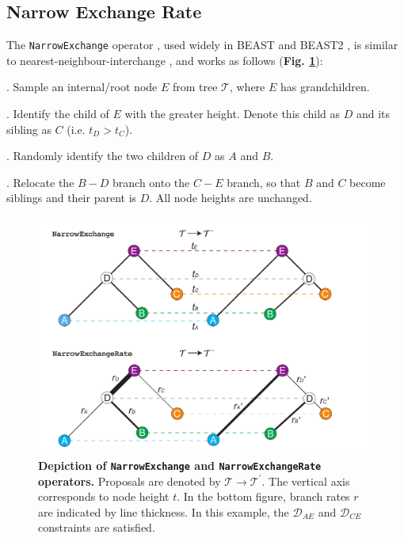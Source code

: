 \documentclass[10pt,letterpaper]{article}
\begin{document}
\subsection*{Narrow Exchange Rate} \label{sect:NER}

The \texttt{NarrowExchange} operator \cite{drummond2002estimating}, used widely in BEAST \cite{drummond2012bayesian,suchard2018bayesian} and BEAST2 \cite{bouckaert2019beast}, is similar to nearest-neighbour-interchange \cite{semple2003phylogenetics}, and works as follows (\textbf{Fig. \ref{fig:narrowexchange}}):

. Sample an internal/root node $E$ from tree $\mathcal{T}$, where $E$ has grandchildren.

. Identify the child of $E$ with the greater height. Denote this child as $D$ and its sibling as $C$ (i.e. $t_D > t_C$).

. Randomly identify the two children of $D$ as $A$ and $B$.

. Relocate the $B-D$ branch onto the $C-E$ branch, so that $B$ and $C$ become siblings and their parent is $D$. All node heights are unchanged.


\begin{figure}[!h]
\includegraphics[width=\textwidth]{Figures/NarrowExchange.pdf}
\caption{\textbf{Depiction of \texttt{NarrowExchange} and \texttt{NarrowExchangeRate} operators.} Proposals are denoted by $\mathcal{T} \rightarrow \mathcal{T}^\prime$. The vertical axis corresponds to node height $t$. In the bottom figure, branch rates $r$ are indicated by line thickness. In this example, the $\mathcal{D}_{AE}$ and $\mathcal{D}_{CE}$ constraints are satisfied.}
\label{fig:narrowexchange}
\end{figure}
\end{document}
